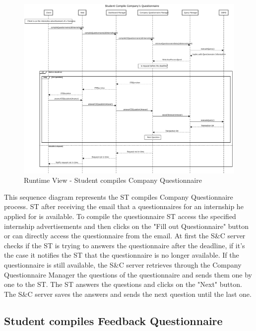 \begin{figure}[H]
      \centering
      \includegraphics[width=1.0\textwidth]{Images/RV_04a.pdf}
      \caption{Runtime View - Student compiles Company Questionnaire}
      \label{fig:rv-student-compiles-company-questionnaire}
\end{figure}

\par This sequence diagram represents the ST compiles Company Questionnaire process. ST after receiving the email that
a questionnaires for an internship he applied for is available. To compile the questionnaire ST access the specified internship
advertisements and then clicks on the "Fill out Questionnaire" button or can directly access the questionnaire from the email. 
At first the S\&C server checks if the ST is trying to answers the questionnaire after the deadline, if it's the case it notifies
the ST that the questionnaire is no longer available. If the questionnaire is still available, the S\&C server retrieves through
the Company Questionnaire Manager the questions of the questionnaire and sends them one by one to the ST.
The ST answers the questions and clicks on the "Next" button. The S\&C server saves the answers and sends the next question
until the last one.  

\subsection{Student compiles Feedback Questionnaire}
\label{sub:student-compiles-feedback-questionnaire}%

